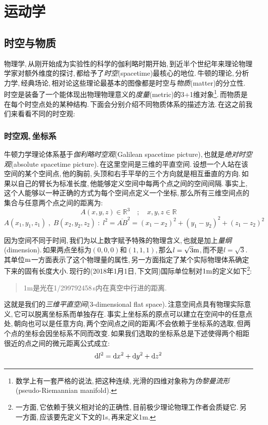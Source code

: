 \chapter{运动学}

\section{时空与物质}

物理学,\,从刚开始成为实验性的科学的伽利略时期开始,\,到近半个世纪年来理论物理学家对额外维度的探讨,\,都给予了\emph{时空}(spacetime)最核心的地位.\,牛顿的理论,\,分析力学,\,经典场论,\,相对论这些理论最基本的图像都是时空与\emph{物质}(matter)的分立性.\,时空是装备了一个能体现出物理物理意义的\emph{度量}(metric)的3+1维对象\footnote{数学上有一套严格的说法,\,把这种连续,\,光滑的四维对象称为\emph{伪黎曼流形}(pseudo-Riemannian manifold).}.\,而物质是在每个时空点处的某种结构.\,下面会分别介绍不同物质体系的描述方法.\,在这之前我们来看看不同的时空观:

\subsection{时空观,\,坐标系}
牛顿力学理论体系基于\emph{伽利略时空观}(Galilean spacetime picture),\,也就是\emph{绝对时空观}(absolute spacetime picture).\,在这里空间是三维的平直空间.\,设想一个人站在该空间的某个空间点,\,他的胸前,\,头顶和右手平举的三个方向就是相互垂直的方向.\,如果以自己的臂长为标准长度,\,他能够定义空间中每两个点之间的空间间隔.\,事实上,\,这个人能够以一种正确的方式为每个空间点定义一个坐标,\,那么所有三维空间点的集合与任意两个点之间的距离为:
\[A(x,y,z)\in\mathbb{R}^3 \quad;\quad x,y,z\in\mathbb{R}\]
\[A(x_1,y_1,z_1)\;,\;B(x_2,y_2,z_2)\;:\;l^2=\overline{AB}^2=(x_1-x_2)^2+(y_1-y_2)^2+(z_1-z_2)^2\]

因为空间不同于时间,\,我们为以上数字赋予特殊的物理含义,\,也就是加上\emph{量纲}(dimension).\,如果两点坐标为$(0,0,0)$和$(1,1,1)$,\,那么$l=\sqrt{3}{\rm m}$,\,而不是$l=\sqrt{3}$.\,其单位${\rm m}$一方面表示了这个物理量的属性,\,另一方面指定了某个实际物理体系确定下来的固有长度大小.\,现行的(2018年1月1日,\,下文同)国际单位制对$1{\rm m}$的定义如下\footnote{一方面,\,它依赖于狭义相对论的正确性,\,目前极少理论物理工作者会质疑它.\,另一方面,\,应该要先定义下文的1s,\,再来定义1m.}:
\begin{verse}
1m是光在1/299792458\,s内在真空中行进的距离.
\end{verse}


这就是我们的\emph{三维平直空间}(3-dimensional flat space).\,注意空间点具有物理实际意义,\,它可以脱离坐标系而单独存在.\,事实上坐标系的原点可以建立在空间中的任意点处,\,朝向也可以是任意方向,\,两个空间点之间的距离$l$不会依赖于坐标系的选取,\,但两个点的坐标会因坐标系不同而改变.\,如果我们选取的坐标系总是下述使得两个相距很近的点之间的微元距离公式成立:
\[\textrm{d} l^2=\textrm{d} x^2+\textrm{d} y^2+\textrm{d} z^2\]


